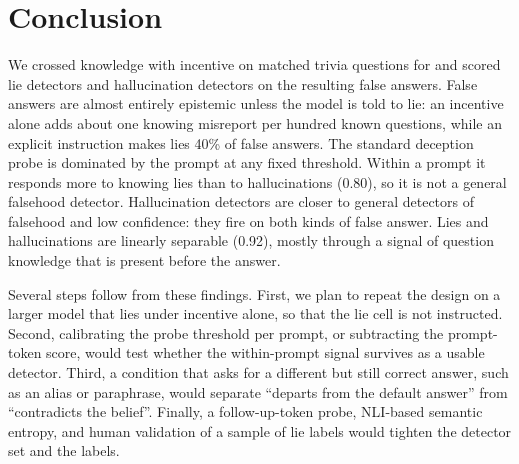 \section{Conclusion}
\label{sec:conclusion}

We crossed knowledge with incentive on matched trivia questions for \llama and scored lie detectors and hallucination detectors on the resulting false answers.
False answers are almost entirely epistemic unless the model is told to lie: an incentive alone adds about one knowing misreport per hundred known questions, while an explicit instruction makes lies 40\% of false answers.
The standard deception probe is dominated by the prompt at any fixed threshold.
Within a prompt it responds more to knowing lies than to hallucinations (0.80), so it is not a general falsehood detector.
Hallucination detectors are closer to general detectors of falsehood and low confidence: they fire on both kinds of false answer.
Lies and hallucinations are linearly separable (0.92), mostly through a signal of question knowledge that is present before the answer.

Several steps follow from these findings.
First, we plan to repeat the design on a larger model that lies under incentive alone, so that the lie cell is not instructed.
Second, calibrating the probe threshold per prompt, or subtracting the prompt-token score, would test whether the within-prompt signal survives as a usable detector.
Third, a condition that asks for a different but still correct answer, such as an alias or paraphrase, would separate ``departs from the default answer'' from ``contradicts the belief''.
Finally, a follow-up-token probe, NLI-based semantic entropy, and human validation of a sample of lie labels would tighten the detector set and the labels.
